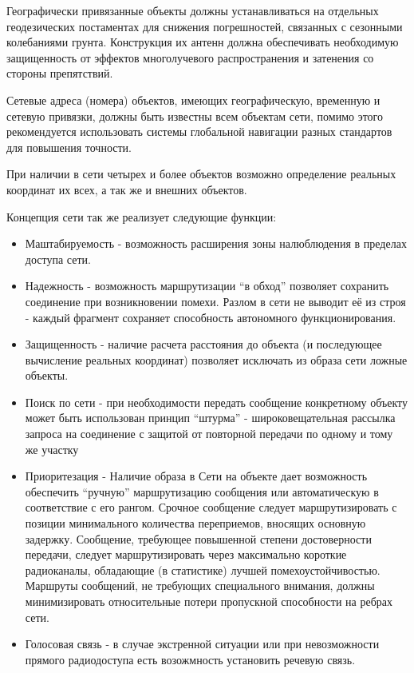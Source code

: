 \documentclass[a4paper,12pt]{report} %
\begin{document}
Географически привязанные объекты должны устанавливаться на отдельных
геодезических постаментах для снижения погрешностей, связанных с сезонными
колебаниями грунта. Конструкция их антенн должна обеспечивать необходимую
защищенность от эффектов многолучевого распространения и затенения со стороны
препятствий.

Сетевые адреса (номера) объектов, имеющих географическую, временную и сетевую
привязки, должны быть известны всем объектам сети, помимо этого рекомендуется
использовать системы глобальной навигации разных стандартов для повышения
точности.

При наличии в сети четырех и более объектов возможно определение реальных
координат их всех, а так же и внешних объектов.

Концепция сети так же реализует следующие функции:


\begin{itemize}
\item Маштабируемость - возможность расширения зоны налюблюдения в пределах
  доступа сети.
\item Надежность - возможность маршрутизации ``в обход'' позволяет сохранить
  соединение при возникновении помехи. Разлом в сети не выводит её из строя -
  каждый фрагмент сохраняет способность автономного функционирования.
\item Защищенность - наличие расчета расстояния до объекта (и последующее
  вычисление реальных координат) позволяет исключать из образа сети ложные
  объекты.
\item Поиск по сети - при необходимости передать сообщение конкретному объекту
  может быть использован принцип ``штурма'' - широковещательная рассылка запроса
  на соединение с защитой от повторной передачи по одному и тому же участку
\item Приоритезация - Наличие образа в Сети на объекте дает возможность
  обеспечить ``ручную'' маршрутизацию сообщения или автоматическую в
  соответствие с его рангом. Срочное сообщение следует маршрутизировать с
  позиции минимального количества переприемов,  вносящих основную задержку.
  Сообщение, требующее повышенной степени достоверности передачи, следует
  маршрутизировать через максимально короткие радиоканалы, обладающие (в
  статистике) лучшей помехоустойчивостью. Маршруты сообщений, не требующих
  специального внимания, должны минимизировать относительные потери пропускной
  способности на ребрах сети. 
  \item Голосовая связь - в случае экстренной ситуации или при невозможности
    прямого радиодоступа есть возожмность установить речевую связь.
\end{itemize}
\newpage
\end{document}

